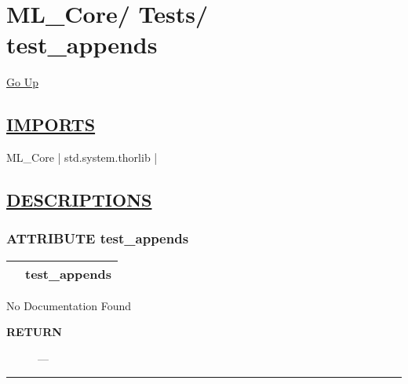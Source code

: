 \chapter*{\color{headfile}
{\large ML\_Core\slash\hspace{0pt}}
{\large Tests\slash\hspace{0pt}}
 \\
test_appends
}
\hypertarget{ecldoc:toc:ML_Core.Tests.test_appends}{}
\hyperlink{ecldoc:toc:root/ML_Core/Tests}{Go Up}

\section*{\underline{\textsf{IMPORTS}}}
\begin{doublespace}
{\large
ML\_Core |
std.system.thorlib |
}
\end{doublespace}

\section*{\underline{\textsf{DESCRIPTIONS}}}
\subsection*{\textsf{\colorbox{headtoc}{\color{white} ATTRIBUTE}
test\_appends}}

\hypertarget{ecldoc:ml_core.tests.test_appends}{}

{\renewcommand{\arraystretch}{1.5}
\begin{tabularx}{\textwidth}{|>{\raggedright\arraybackslash}l|X|}
\hline
\hspace{0pt}\mytexttt{\color{red} } & \textbf{test\_appends} \\
\hline
\end{tabularx}
}

\par





No Documentation Found








\par
\begin{description}
\item [\colorbox{tagtype}{\color{white} \textbf{\textsf{RETURN}}}] \textbf{} --- 
\end{description}




\rule{\linewidth}{0.5pt}
